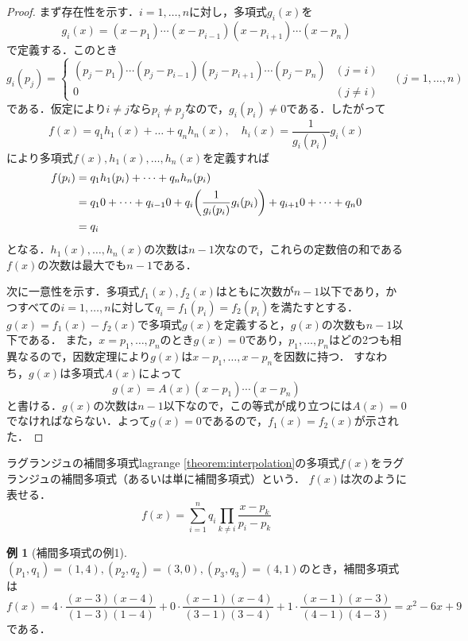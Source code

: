 \documentclass[a4paper]{ltjsarticle}
\theoremstyle{definition}
\newtheorem{example}{例}[section]
\DeclarePairedDelimiter{\pqty}{\lparen}{\rparen}
\begin{document}
\begin{proof}
  まず存在性を示す．$i=1,\dots,n$に対し，多項式$g_i(x)$を
  \[
    g_i(x) = (x-p_1) \dotsm (x-p_{i-1})(x-p_{i+1}) \dotsm (x-p_n)
  \]
  で定義する．このとき
  \[
    g_i(p_j) = {
      \begin{cases}
        (p_j-p_1) \dotsm (p_j-p_{i-1})(p_j-p_{i+1}) \dotsm (p_j-p_n) & (j = i) \\
        0 & (j \neq i)
      \end{cases}
      \quad
      (j = 1,\dots,n)
    }
  \]
  である．仮定により$i \neq j$なら$p_i \neq p_j$なので，$g_i (p_i) \neq 0$である．したがって
  \[
    f(x) = q_1h_1(x) + \dots + q_nh_n(x),
    \quad
    h_i(x) = \frac{1}{g_i(p_i)} g_i(x)
  \]
  により多項式$f(x), h_1(x), \dots, h_n(x)$を定義すれば
  \begin{align*}
    f(p_i)
    &= q_1h_1(p_i) + \dots + q_nh_n(p_i) \\
    &= q_10 + \dots + q_{i-1}0 + q_i\pqty*{\frac{1}{g_i(p_i)} g_i(p_i)} + q_{i+1}0 + \dots + q_n0 \\
    &= q_i
  \end{align*}
  となる．$h_1(x), \dots, h_n(x)$の次数は$n-1$次なので，これらの定数倍の和である$f(x)$の次数は最大でも$n-1$である．

  次に一意性を示す．多項式$f_1(x), f_2(x)$はともに次数が$n-1$以下であり，かつすべての$i = 1, \dots, n$に対して$q_i = f_1(p_i) = f_2(p_i)$を満たすとする．
  $g(x) = f_1(x) - f_2(x)$で多項式$g(x)$を定義すると，$g(x)$の次数も$n-1$以下である．
  また，$x = p_1, \dots, p_n$のとき$g(x) = 0$であり，$p_1,\dots,p_n$はどの2つも相異なるので，因数定理により$g(x)$は$x-p_1,\dots,x-p_n$を因数に持つ．
  すなわち，$g(x)$は多項式$A(x)$によって
  \[
    g(x) = A(x)(x-p_1) \dotsm (x-p_n)
  \]
  と書ける．$g(x)$の次数は$n-1$以下なので，この等式が成り立つには$A(x) = 0$でなければならない．よって$g(x) = 0$であるので，$f_1(x) = f_2(x)$が示された．
\end{proof}

\begin{definition}{ラグランジュの補間多項式}{lagrange}
  \cref{theorem:interpolation}の多項式$f(x)$をラグランジュの補間多項式（あるいは単に補間多項式）という．
  $f(x)$は次のように表せる{\footnotemark}．
  \[
    f(x) = \sum_{i=1}^n q_i \prod_{k\neq i} \frac{x - p_k}{p_i - p_k}
  \]
\end{definition}

\begin{example}[補間多項式の例1]
  \label{example:lagrange_1}
  $(p_1,q_1)=(1,4),(p_2,q_2)=(3,0),(p_3,q_3)=(4,1)$のとき，補間多項式は
  \[
    f(x)
    = 4\cdot\frac{(x-3)(x-4)}{(1-3)(1-4)} + 0\cdot\frac{(x-1)(x-4)}{(3-1)(3-4)} + 1\cdot\frac{(x-1)(x-3)}{(4-1)(4-3)}
    = x^2-6x+9
  \]
  である．
\end{example}
\end{document}
